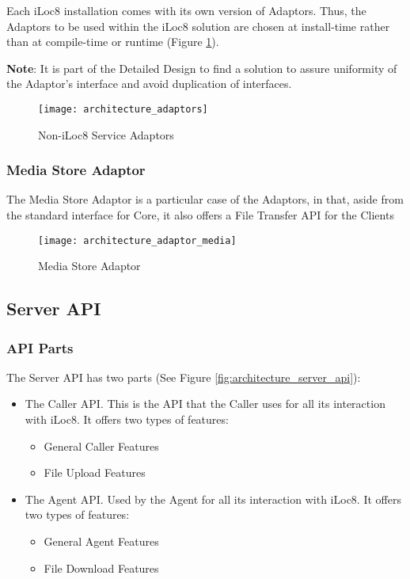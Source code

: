 \documentclass{article}
\begin{document}
	Each iLoc8 installation comes with its own version of Adaptors. Thus, the Adaptors to be used within the iLoc8 solution are chosen at install-time rather than at compile-time or runtime (Figure \ref{fig:architecture_adaptors}).

	\textbf{Note}: It is part of the Detailed Design to find a solution to assure uniformity of the Adaptor's interface and avoid duplication of interfaces.

	\begin{figure}[htbp]
		\hspace{0cm}
		\texttt{[image: architecture\_adaptors]}
		\caption{Non-iLoc8 Service Adaptors}
		\label{fig:architecture_adaptors}
	\end{figure}
	
	\newpage
	
	\subsubsection{Media Store Adaptor}
	
	The Media Store Adaptor is a particular case of the Adaptors, in that, aside from the standard interface for Core, it also offers a File Transfer API for the Clients

	\begin{figure}[htbp]
		\hspace{-3cm}
		\texttt{[image: architecture\_adaptor\_media]}
		\caption{Media Store Adaptor}
		\label{fig:architecture_adaptor_media}
	\end{figure}
	
	\subsection{Server API}
	
	\subsubsection{API Parts}
	
	The Server API has two parts (See Figure \ref{fig:architecture_server_api}):
	\begin{itemize}
		\item The Caller API. This is the API that the Caller uses for all its interaction with iLoc8. It offers two types of features:
		\begin{itemize}
			\item General Caller Features
			\item File Upload Features
		\end{itemize}
		\item The Agent API. Used by the Agent for all its interaction with iLoc8. It offers two types of features:
		\begin{itemize}
			\item General Agent Features
			\item File Download Features
		\end{itemize}
	\end{itemize}
	
\end{document}
